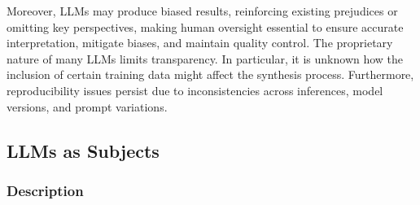 Moreover, LLMs may produce biased results, reinforcing existing prejudices or omitting key perspectives, making human oversight essential to ensure accurate interpretation, mitigate biases, and maintain quality control.
The proprietary nature of many LLMs limits transparency. In particular, it is unknown how the inclusion of certain training data might affect the synthesis process.
Furthermore, reproducibility issues persist due to inconsistencies across inferences, model versions, and prompt variations.


\subsection{LLMs as Subjects}
\label{sec:llms-as-subjects}

\subsubsection{Description}

